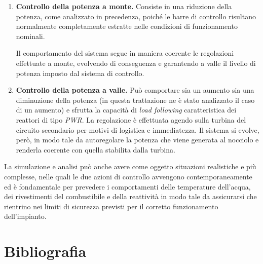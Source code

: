 \documentclass[12pt]{report}
\begin{document}
\begin{enumerate}
    \item \textbf{Controllo della potenza a monte.} Consiste in una riduzione della potenza, come analizzato in precedenza, poiché le barre di controllo risultano normalmente completamente estratte nelle condizioni di funzionamento nominali.

    Il comportamento del sistema segue in maniera coerente le regolazioni effettuate a monte, evolvendo di conseguenza e garantendo a valle il livello di potenza imposto dal sistema di controllo.

    \item \textbf{Controllo della potenza a valle.} Può comportare sia un aumento sia una diminuzione della potenza (in questa trattazione ne è stato analizzato il caso di un aumento) e sfrutta la capacità di \emph{load following} caratteristica dei reattori di tipo \textit{PWR}. La regolazione è effettuata agendo sulla turbina del circuito secondario per motivi di logistica e immediatezza. Il sistema si evolve, però, in modo tale da autoregolare la potenza che viene generata al nocciolo e renderla coerente con quella stabilita dalla turbina.
\end{enumerate}
La simulazione e analisi può anche avere come oggetto situazioni realistiche e più complesse, nelle quali le due azioni di controllo avvengono contemporaneamente ed è fondamentale per prevedere i comportamenti delle temperature dell’acqua, dei rivestimenti del combustibile e della reattività in modo tale da assicurarsi che rientrino nei limiti di sicurezza previsti per il corretto funzionamento dell’impianto.
\chapter*{Bibliografia}
\printbibliography[heading=none]
\end{document}
